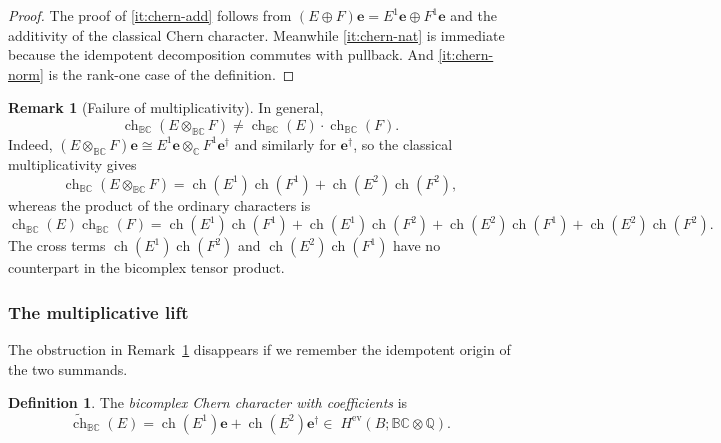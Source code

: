 \documentclass[11pt]{amsart}
\newcommand{\BC}{\mathbb{BC}}       %
\newcommand{\C}{\mathbb{C}}          %
\newcommand{\e}{\mathbf{e}}          %
\newcommand{\ed}{\mathbf{e}^\dagger} %
\theoremstyle{definition}
\newtheorem{defn}[prop]{Definition}       %
\newtheorem{remark}[prop]{Remark}            %
\begin{document}
\begin{proof}
The proof of \eqref{it:chern-add} follows from $(E\oplus F)\e=E^1\e\oplus F^1\e$ and the additivity of the classical Chern character. Meanwhile \eqref{it:chern-nat} is immediate because the idempotent decomposition commutes with pullback. And \eqref{it:chern-norm} is the rank-one case of the definition.
\end{proof}

\begin{remark}[Failure of multiplicativity]\label{rem:non-mult}
In general,
\begin{equation*}
\operatorname{ch}_{\BC}(E\otimes_{\BC}F)\neq\operatorname{ch}_{\BC}(E)\cdot\operatorname{ch}_{\BC}(F).
\end{equation*}
Indeed, $(E\otimes_{\BC}F)\e\cong E^1\e\otimes_{\C} F
^1\ed$ and similarly for $\ed$, so the classical multiplicativity gives
\begin{equation*}
\operatorname{ch}_{\BC}(E\otimes_\BC F)
=\operatorname{ch}(E^1)\operatorname{ch}(F^1)+\operatorname{ch}(E^2)\operatorname{ch}(F^2),
\end{equation*}
whereas the product of the ordinary characters is
\begin{equation*}
\operatorname{ch}_{\BC}(E)\operatorname{ch}_{\BC}(F)
=\operatorname{ch}(E^1)\operatorname{ch}(F^1)
+\operatorname{ch}(E^1)\operatorname{ch}(F^2)
+\operatorname{ch}(E^2)\operatorname{ch}(F^1)
+\operatorname{ch}(E^2)\operatorname{ch}(F^2).
\end{equation*}
The cross terms $\operatorname{ch}(E^1)\operatorname{ch}(F^2)$ and $\operatorname{ch}(E^2)\operatorname{ch}(F^1)$ have no counterpart in the bicomplex tensor product.
\end{remark}

\subsubsection*{The multiplicative lift}

The obstruction in Remark~\ref{rem:non-mult} disappears if we remember the idempotent origin of the two summands.

\begin{defn}\label{def:ch-lift}
The \emph{bicomplex Chern character with coefficients} is
\begin{equation*}
\widetilde{\operatorname{ch}}_{\BC}(E)
=\operatorname{ch}(E^1)\e+\operatorname{ch}(E^2)\ed\in\;H^{\mathrm{ev}}(B;\BC\otimes\mathbb Q).
\end{equation*}
\end{defn}
\end{document}
